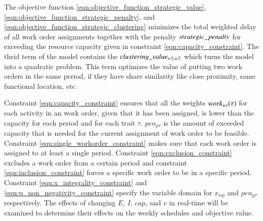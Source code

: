 


The objective function \eqref{eqn:objective_function_strategic_value}, \eqref{eqn:objective_function_strategic_penalty}, and
\eqref{eqn:objective_function_strategic_clustering}
minimizes the total weighted delay of all work order assignments together
with the penalty $strategic\_penalty$ for exceeding the resource capacity given in constraint
\eqref{eqn:capacity_constraint}. The thrid term  
of the model contains the $clustering\_value_{w1, w2}$ which turns the model into a 
quadratic problem. This term optimizes the value of putting two work orders
in the same period, if they have share similarity like close proximity, 
same functional location, etc. 

Constraint \eqref{eqn:capacity_constraint}
ensures that all the weights $work_{wr}(\tau)$ for each activity in an work
order, given that it has been assigned, is lower than the capacity for each
period and for each trait $\tau$. $pen_{p\tau}$ is the amount of exceeded
capacity that is needed for the current assignment of work order to be
feasible. Constraint \eqref{eqn:single_workorder_constraint} makes sure
that each work order is assigned to at least a single period. Constraint
\eqref{eqn:exclusion_constraint} excludes a work order from a certain period
and constraint \eqref{eqn:inclusion_constraint} forces a specific work order
to be in a specific period. Constraint \eqref{eqn:x_integrality_constraint} and
\eqref{eqn:p_non_negativity_constraint} specify the variable domain for $x_{wp}$
and $pen_{p\tau}$ respectively. The effects of changing $E$, $I$, $cap$, and $v$
in real-time will be examined to determine their effects on the weekly schedules
and objective value.

